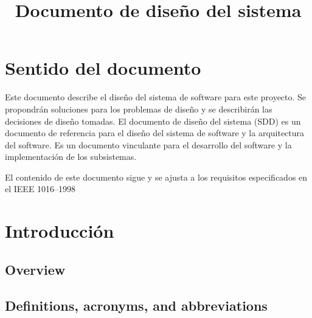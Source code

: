 \documentclass[a4paper,12pt]{article}
\makeatletter
\renewcommand{\maketitle}{\bgroup\setlength{\parindent}{0pt}
    \begin{flushleft}
    {\Huge\textbf{\@title}}
    \end{flushleft}\egroup
}
\makeatother
\begin{document}
    \title{Documento de diseño del sistema\\}
    \maketitle


    \section*{\color{black}Sentido del documento}

    Este documento describe el diseño del sistema de software para este proyecto.
    Se propondrán soluciones para los problemas de diseño y se describirán las decisiones de diseño tomadas.
    El documento de diseño del sistema (SDD) es un documento de referencia para el diseño del sistema de software y la arquitectura del software.
    Es un documento vinculante para el desarrollo del software y la implementación de los subsistemas.

    El contenido de este documento sigue y se ajusta a los requisitos especificados en el IEEE 1016--1998\autocite{IEEE1016-1998}


    \setcounter{tocdepth}{2}
    \tableofcontents


    \section{Introducción}\label{sec:introduccion}

    \subsection{Overview}\label{subsec:overview}

    \subsection{Definitions, acronyms, and abbreviations}\label{subsec:definitions-acronyms-and-abbreviations}





    \printbibliography
\end{document}

